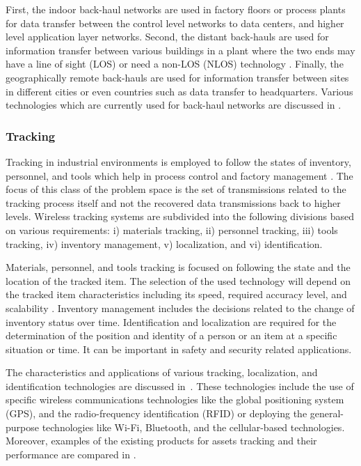 First, the indoor back-haul networks are used in factory floors or process plants for data transfer between the control level networks to data centers, and higher level application layer networks. Second, the distant back-hauls are used for information transfer between various buildings in a plant where the two ends  may have a line of sight (LOS) or need a non-LOS (NLOS) technology \cite{PS-backhaul}. Finally, the geographically remote back-hauls are used for information transfer between sites in different cities or even countries such as data transfer to headquarters. Various technologies which are currently used for back-haul networks are discussed in \cite{PS-backhaul}.   
    
    \subsubsection{Tracking}
Tracking in industrial environments is employed to follow the states of inventory, personnel, and tools which help in process control and factory management \cite{PS_tracking2}. The focus of this class of the problem space is the set of transmissions related to the tracking process itself and not the recovered data transmissions back to higher levels. Wireless tracking systems are subdivided into the following divisions based on various requirements: i) materials tracking, ii) personnel tracking, iii) tools tracking, iv) inventory management, v) localization, and vi) identification. 

Materials, personnel, and tools tracking is focused on following the state and the location of the tracked item. The selection of the used technology will depend on the tracked item characteristics including its speed, required accuracy level, and scalability \cite{PS-tracking1}. Inventory management includes the decisions related to the change of inventory status over time. Identification and localization are required for the determination of the position and identity of a person or an item at a specific situation or time. It can be important in safety and security related applications. 

The characteristics and applications of various tracking, localization, and identification technologies are discussed in~\cite{PS_tracking2}. These technologies include the use of specific wireless communications technologies like the global positioning system (GPS), and the radio-frequency identification (RFID) or deploying the general-purpose technologies like Wi-Fi, Bluetooth, and the cellular-based technologies. Moreover, examples of the existing products for assets tracking and their performance are compared in \cite{PS-tracking1}.  



